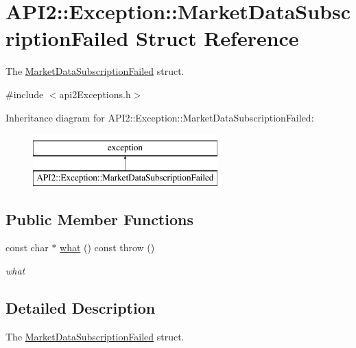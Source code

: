 \hypertarget{struct_a_p_i2_1_1_exception_1_1_market_data_subscription_failed}{\section{A\-P\-I2\-:\-:Exception\-:\-:Market\-Data\-Subscription\-Failed Struct Reference}
\label{struct_a_p_i2_1_1_exception_1_1_market_data_subscription_failed}
}


The \hyperlink{struct_a_p_i2_1_1_exception_1_1_market_data_subscription_failed}{Market\-Data\-Subscription\-Failed} struct.  




{\ttfamily \#include $<$api2\-Exceptions.\-h$>$}

Inheritance diagram for A\-P\-I2\-:\-:Exception\-:\-:Market\-Data\-Subscription\-Failed\-:\begin{figure}[H]
\begin{center}
\leavevmode
\includegraphics[height=2.000000cm]{struct_a_p_i2_1_1_exception_1_1_market_data_subscription_failed}
\end{center}
\end{figure}
\subsection*{Public Member Functions}
\begin{DoxyCompactItemize}
\item 
const char $\ast$ \hyperlink{struct_a_p_i2_1_1_exception_1_1_market_data_subscription_failed_a8fdd7c3f47885fe8690feb6032fa9815}{what} () const   throw ()
\begin{DoxyCompactList}\small\item\em what \end{DoxyCompactList}\end{DoxyCompactItemize}


\subsection{Detailed Description}
The \hyperlink{struct_a_p_i2_1_1_exception_1_1_market_data_subscription_failed}{Market\-Data\-Subscription\-Failed} struct. 


